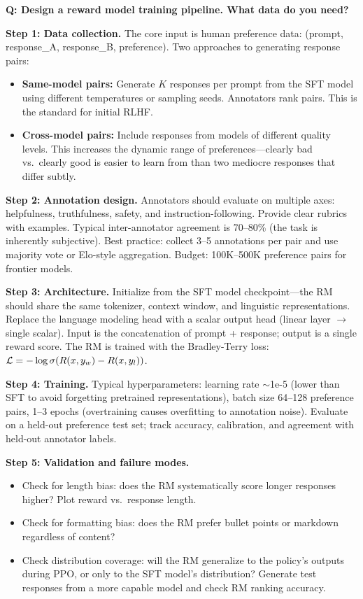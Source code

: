 \begin{interviewq}
\textbf{Q: Design a reward model training pipeline. What data do you need?}

 \quad {} \quad \badgefreq{\freqmed}

\stronganswer

\textbf{Step 1: Data collection.} The core input is human preference data: (prompt, response\_A, response\_B, preference). Two approaches to generating response pairs:
\begin{itemize}
    \item \textbf{Same-model pairs:} Generate $K$ responses per prompt from the SFT model using different temperatures or sampling seeds. Annotators rank pairs. This is the standard for initial RLHF.
    \item \textbf{Cross-model pairs:} Include responses from models of different quality levels. This increases the dynamic range of preferences---clearly bad vs.\ clearly good is easier to learn from than two mediocre responses that differ subtly.
\end{itemize}

\textbf{Step 2: Annotation design.} Annotators should evaluate on multiple axes: helpfulness, truthfulness, safety, and instruction-following. Provide clear rubrics with examples. Typical inter-annotator agreement is 70--80\% (the task is inherently subjective). Best practice: collect 3--5 annotations per pair and use majority vote or Elo-style aggregation. Budget: 100K--500K preference pairs for frontier models.

\textbf{Step 3: Architecture.} Initialize from the SFT model checkpoint---the RM should share the same tokenizer, context window, and linguistic representations. Replace the language modeling head with a scalar output head (linear layer $\rightarrow$ single scalar). Input is the concatenation of prompt + response; output is a single reward score. The RM is trained with the Bradley-Terry loss: $\mathcal{L} = -\log\sigma(R(x, y_w) - R(x, y_l))$.

\textbf{Step 4: Training.} Typical hyperparameters: learning rate $\sim$1e-5 (lower than SFT to avoid forgetting pretrained representations), batch size 64--128 preference pairs, 1--3 epochs (overtraining causes overfitting to annotation noise). Evaluate on a held-out preference test set; track accuracy, calibration, and agreement with held-out annotator labels.

\textbf{Step 5: Validation and failure modes.}
\begin{itemize}
    \item Check for length bias: does the RM systematically score longer responses higher? Plot reward vs.\ response length.
    \item Check for formatting bias: does the RM prefer bullet points or markdown regardless of content?
    \item Check distribution coverage: will the RM generalize to the policy's outputs during PPO, or only to the SFT model's distribution? Generate test responses from a more capable model and check RM ranking accuracy.
\end{itemize}


\end{interviewq}
